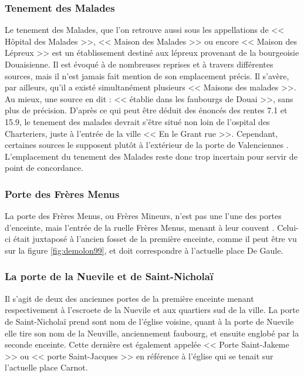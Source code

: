 \subsubsection{Tenement des Malades}
Le tenement des Malades, que l'on retrouve aussi sous les appellations  de << Hôpital des Malades >>, <<  Maison des Malades >> ou encore << Maison des Lépreux >> est un établissement destiné aux lépreux provenant de la bourgeoisie Douaisienne. Il est évoqué à de nombreuses reprises et à travers différentes sources, mais il n'est jamais fait mention de son emplacement précis. Il s'avère, par ailleurs, qu'il a existé simultanément plusieurs << Maisons des malades >>. Au mieux, une  source en dit : << établie dans les faubourgs de Douai >>, sans plus de précision.
D'après ce qui peut être déduit des énoncés des rentes 7.1 et 15.9,  le tenement des malades devrait s'être situé non loin de l'ospital des Charteriers, juste à  l'entrée de la ville  << En le Grant rue >>.  Cependant, certaines sources le supposent plutôt à l'extérieur de la porte de Valenciennes \parencite{brassart_notes_1842}.
L'emplacement du tenement des Malades reste donc trop incertain pour servir de point de concordance.

\subsubsection{Porte des Frères Menus}
La porte des Frères Menus, ou Frères Mineurs, n'est pas une l'une des portes d'enceinte, mais l'entrée de la ruelle Frères Menus, menant à leur couvent \parencite{duthilloeul_douai_1864}. Celui-ci était juxtaposé à l'ancien fosset de la première enceinte, comme il peut être vu sur la figure \ref{fig:demolon99}, et doit correspondre à l'actuelle place De Gaule. 

\subsubsection{La porte de la Nuevile et de Saint-Nicholaï}
Il s'agit de deux des anciennes portes de la première enceinte menant respectivement à l'escroete de la Nuevile et aux quartiers sud  de la ville. La porte de Saint-Nicholaï prend sont nom de l'église voisine, quant à la porte de Nuevile elle tire son nom de la Neuville, anciennement faubourg, et ensuite englobé par la seconde enceinte. Cette dernière est également appelée << Porte Saint-Jakeme >> ou << porte Saint-Jacques >> en référence à l'église  qui se tenait sur l'actuelle place Carnot.

